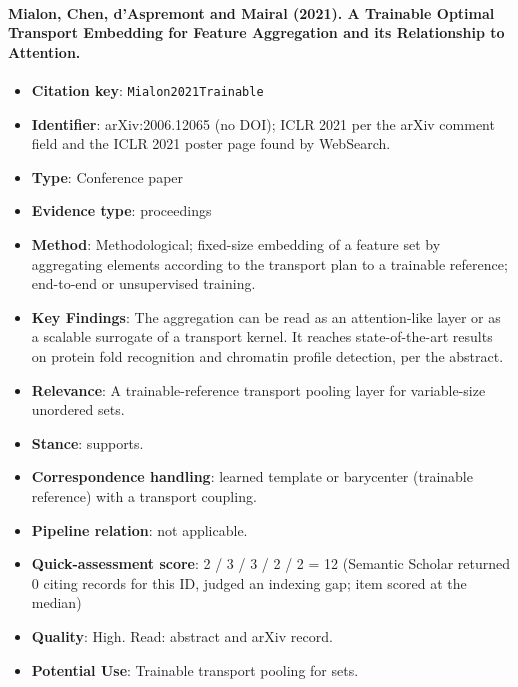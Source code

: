 \documentclass[journal,onecolumn]{IEEEtran}
\begin{document}
\paragraph{Mialon, Chen, d'Aspremont and Mairal (2021). A Trainable Optimal Transport Embedding for Feature Aggregation and its Relationship to Attention.~\cite{Mialon2021Trainable}}\mbox{}

\begin{itemize}

\item{} \textbf{Citation key}: \texttt{Mialon2021Trainable}

\item{} \textbf{Identifier}: arXiv:2006.12065 (no DOI); ICLR 2021 per the arXiv comment field and the ICLR 2021 poster page found by WebSearch.

\item{} \textbf{Type}: Conference paper

\item{} \textbf{Evidence type}: proceedings

\item{} \textbf{Method}: Methodological; fixed-size embedding of a feature set by aggregating elements according to the transport plan to a trainable reference; end-to-end or unsupervised training.

\item{} \textbf{Key Findings}: The aggregation can be read as an attention-like layer or as a scalable surrogate of a transport kernel. It reaches state-of-the-art results on protein fold recognition and chromatin profile detection, per the abstract.

\item{} \textbf{Relevance}: A trainable-reference transport pooling layer for variable-size unordered sets.

\item{} \textbf{Stance}: supports.

\item{} \textbf{Correspondence handling}: learned template or barycenter (trainable reference) with a transport coupling.

\item{} \textbf{Pipeline relation}: not applicable.

\item{} \textbf{Quick-assessment score}: 2 / 3 / 3 / 2 / 2 = 12 (Semantic Scholar returned 0 citing records for this ID, judged an indexing gap; item scored at the median)

\item{} \textbf{Quality}: High. Read: abstract and arXiv record.

\item{} \textbf{Potential Use}: Trainable transport pooling for sets.

\end{itemize}
\end{document}
